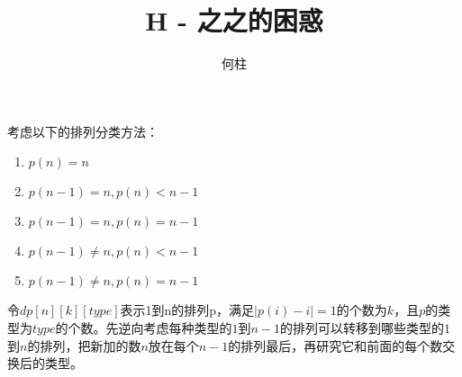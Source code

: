 \documentclass[a4paper]{ctexart}
\title{H - 之之的困惑}
\author{何柱}
\begin{document}
	\maketitle
	考虑以下的排列分类方法：
	\begin{enumerate}[A]
		\item $p(n)=n$
		\item $p(n-1)=n, p(n)<n-1$
		\item $p(n-1)=n, p(n)=n-1$
		\item $p(n-1)\neq n, p(n)<n-1$
		\item $p(n-1)\neq n, p(n)=n-1$
	\end{enumerate}

	令$dp[n][k][type]$表示1到n的排列p，满足$|p(i)-i|=1$的个数为$k$，且$p$的类型为$type$的个数。先逆向考虑每种类型的$1$到$n-1$的排列可以转移到哪些类型的$1$到$n$的排列，把新加的数$n$放在每个$n-1$的排列最后，再研究它和前面的每个数交换后的类型。
\end{document}
